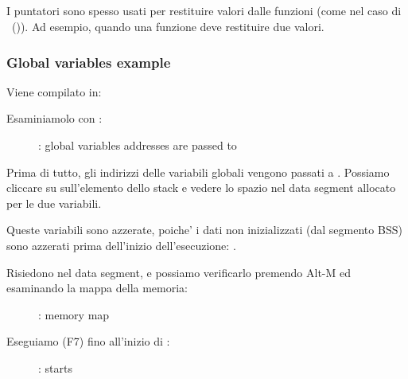 \subsection{\ITAph{}}

I puntatori sono spesso usati per restituire valori dalle funzioni (come nel caso di \scanf ~()).
Ad esempio, quando una funzione deve restituire due valori.

\subsubsection{Global variables example}



Viene compilato in:



\myindex{\olly}
\clearpage
Esaminiamolo con \olly:

\begin{figure}[H]
\centering
{}
\caption{\olly: 
global variables addresses are passed to \ttfone}
\label{fig:pointers_olly_global_1}
\end{figure}

Prima di tutto, gli indirizzi delle variabili globali vengono passati a \ttfone.
Possiamo cliccare su  sull'elemento dello stack e vedere lo spazio nel data segment allocato per le due variabili.

\clearpage
Queste variabili sono azzerate, poiche' i dati non inizializzati (dal segmento \ac{BSS}) sono azzerati prima dell'inizio dell'esecuzione: .

Risiedono nel data segment, e possiamo verificarlo premendo Alt-M ed esaminando la mappa della memoria:

\begin{figure}[H]
\centering
{}
\caption{\olly: memory map}
\label{fig:pointers_olly_global_5}
\end{figure}

\clearpage
Eseguiamo (F7) fino all'inizio di \ttfone: 

\begin{figure}[H]
\centering
{}
\caption{\olly: \ttfone starts}
\label{fig:pointers_olly_global_2}
\end{figure}

